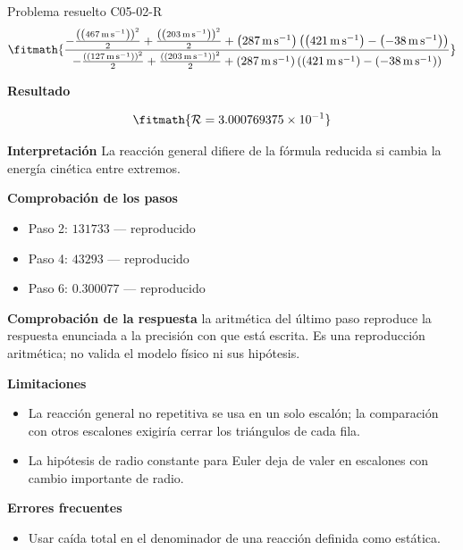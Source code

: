 \documentclass[10pt,openany]{book}
\begin{document}
\begin{studiumworked}{Problema resuelto C05-02-R}
\[
\fitmath{\frac{- \frac{\left(\left(467\,\mathrm{m}\,\mathrm{s}^{-1}\right)\right)^{2}}{2} + \frac{\left(\left(203\,\mathrm{m}\,\mathrm{s}^{-1}\right)\right)^{2}}{2} + \left(287\,\mathrm{m}\,\mathrm{s}^{-1}\right) \left(\left(421\,\mathrm{m}\,\mathrm{s}^{-1}\right) - \left(-38\,\mathrm{m}\,\mathrm{s}^{-1}\right)\right)}{- \frac{\left(\left(127\,\mathrm{m}\,\mathrm{s}^{-1}\right)\right)^{2}}{2} + \frac{\left(\left(203\,\mathrm{m}\,\mathrm{s}^{-1}\right)\right)^{2}}{2} + \left(287\,\mathrm{m}\,\mathrm{s}^{-1}\right) \left(\left(421\,\mathrm{m}\,\mathrm{s}^{-1}\right) - \left(-38\,\mathrm{m}\,\mathrm{s}^{-1}\right)\right)}}
\]

\noindent\textbf{Resultado}

\[
\fitmath{\mathcal R=3.000769375\times10^{-1}}
\]

\noindent\textbf{Interpretación}
La reacción general difiere de la fórmula reducida si cambia la energía cinética entre extremos.

\noindent\textbf{Comprobación de los pasos}
\begin{itemize}
\item Paso 2: $131733$ — reproducido
\item Paso 4: $43293$ — reproducido
\item Paso 6: $0.300077$ — reproducido
\end{itemize}

\noindent\textbf{Comprobación de la respuesta} la aritmética del último paso reproduce la respuesta enunciada a la precisión con que está escrita. Es una reproducción aritmética; no valida el modelo físico ni sus hipótesis.

\noindent\textbf{Limitaciones}
\begin{itemize}
\item La reacción general no repetitiva se usa en un solo escalón; la comparación con otros escalones exigiría cerrar los triángulos de cada fila.
\item La hipótesis de radio constante para Euler deja de valer en escalones con cambio importante de radio.
\end{itemize}

\noindent\textbf{Errores frecuentes}
\begin{itemize}
\item Usar caída total en el denominador de una reacción definida como estática.
\end{itemize}
\end{studiumworked}
\end{document}
